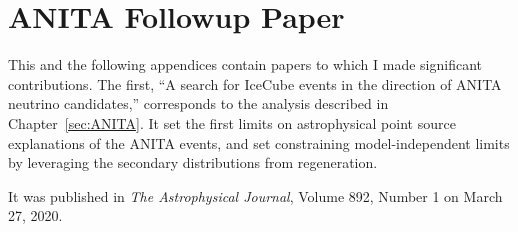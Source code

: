 \chapter{ANITA Followup Paper}
\label{app:ANITA_collaboration_paper}

This and the following appendices contain papers to which I made significant contributions. The first, ``A search for IceCube events in the direction of ANITA neutrino candidates,'' corresponds to the analysis described in Chapter~\ref{sec:ANITA}. It set the first limits on astrophysical point source explanations of the ANITA events, and set constraining model-independent limits by leveraging the secondary \nutau distributions from \nutau regeneration. 

It was published in \textit{The Astrophysical Journal}, Volume 892, Number 1 on March 27, 2020. 



